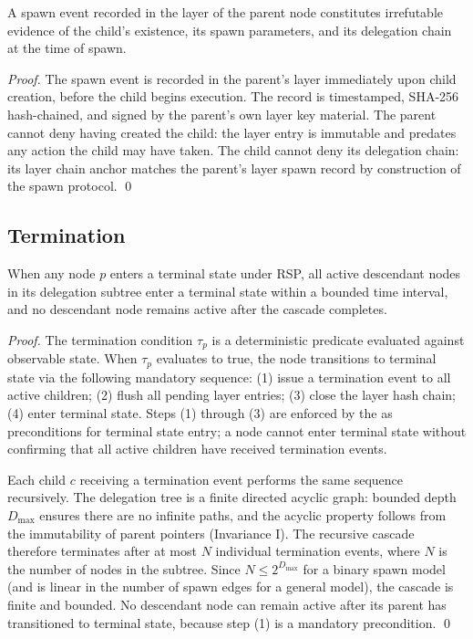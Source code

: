 \begin{prop}
\label{prop:non-repudiation}
A spawn event recorded in the \fact layer of the parent node constitutes irrefutable evidence of the child's existence, its spawn parameters, and its delegation chain at the time of spawn.
\end{prop}

\begin{proof}
The spawn event is recorded in the parent's \fact layer immediately upon child creation, before the child begins execution. The record is timestamped, SHA-256 hash-chained, and signed by the parent's own \fact layer key material. The parent cannot deny having created the child: the \fact layer entry is immutable and predates any action the child may have taken. The child cannot deny its delegation chain: its \purpose layer chain anchor matches the parent's \fact layer spawn record by construction of the spawn protocol. \qed
\end{proof}

\subsection{Termination}

\begin{thrm}[Termination]
\label{thrm:termination}
When any node $p$ enters a terminal state under RSP, all active descendant nodes in its delegation subtree enter a terminal state within a bounded time interval, and no descendant node remains active after the cascade completes.
\end{thrm}

\begin{proof}
The termination condition $\tau_p$ is a deterministic predicate evaluated against observable state. When $\tau_p$ evaluates to true, the node transitions to terminal state via the following mandatory sequence: (1) issue a termination event to all active children; (2) flush all pending \fact layer entries; (3) close the \fact layer hash chain; (4) enter terminal state. Steps (1) through (3) are enforced by the \bounds as preconditions for terminal state entry; a node cannot enter terminal state without confirming that all active children have received termination events.

Each child $c$ receiving a termination event performs the same sequence recursively. The delegation tree is a finite directed acyclic graph: bounded depth $D_{\max}$ ensures there are no infinite paths, and the acyclic property follows from the immutability of parent pointers (Invariance I). The recursive cascade therefore terminates after at most $N$ individual termination events, where $N$ is the number of nodes in the subtree. Since $N \leq 2^{D_{\max}}$ for a binary spawn model (and is linear in the number of spawn edges for a general model), the cascade is finite and bounded. No descendant node can remain active after its parent has transitioned to terminal state, because step (1) is a mandatory precondition. \qed
\end{proof}

